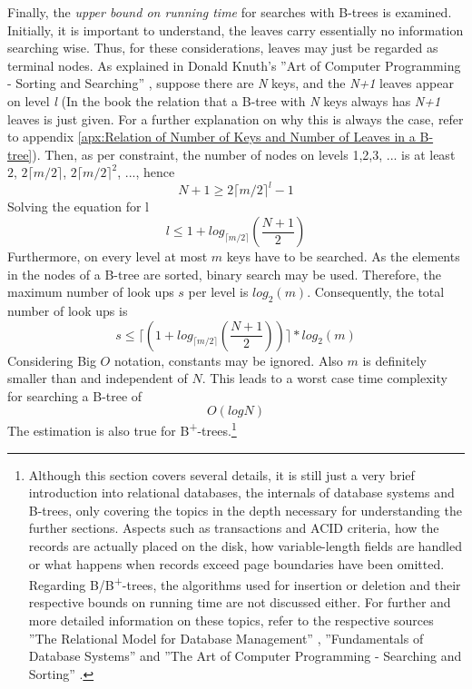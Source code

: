 Finally, the \emph{upper bound on running time} for searches with B-trees is examined. Initially, it is important to understand, the leaves carry essentially no information searching wise. Thus, for these considerations, leaves may just be regarded as terminal nodes. As explained in Donald Knuth's ''Art of Computer Programming - Sorting and Searching'' \cite{SortingSearchingBible}, suppose there are \emph{N} keys, and the \emph{N+1} leaves appear on level \emph{l} (In the book the relation that a B-tree with \emph{N} keys always has \emph{N+1} leaves is just given. For a further explanation on why this is always the case, refer to appendix \ref{apx:Relation of Number of Keys and Number of Leaves in a B-tree}). Then, as per constraint, the number of nodes on levels 1,2,3, ... is at least $2$, $2 \lceil m/2 \rceil$, $2 \lceil m/2 \rceil ^2$, ..., hence
$$ N + 1 \geq 2 \lceil m/2 \rceil ^l-1 $$
Solving the equation for l
$$ l \leq 1 + log_{\lceil m/2 \rceil}(\frac{N + 1}{2}) $$
Furthermore, on every level at most $m$ keys have to be searched. As the elements in the nodes of a B-tree are sorted, binary search may be used. Therefore, the maximum number of look ups $s$ per level is $log_2(m)$. Consequently, the total number of look ups is 
$$ s \leq \lceil (1 + log_{\lceil m/2 \rceil}(\frac{N + 1}{2})) \rceil * log_2(m) $$ 
Considering Big $O$ notation, constants may be ignored. Also $m$ is definitely smaller than and independent of $N$. This leads to a worst case time complexity for searching a B-tree of 
$$ O(log N) $$ 
The estimation is also true for B\textsuperscript{+}-trees.\footnote{Although this section covers several details, it is still just a very brief introduction into relational databases, the internals of database systems and B-trees, only covering the topics in the depth necessary for understanding the further sections. Aspects such as transactions and ACID criteria, how the records are actually placed on the disk, how variable-length fields are handled or what happens when records exceed page boundaries have been omitted. Regarding B/B\textsuperscript{+}-trees, the algorithms used for insertion or deletion and their respective bounds on running time are not discussed either. For further and more detailed information on these topics, refer to the respective sources ''The Relational Model for Database Management'' \cite{RelationalDatabaseModel}, ''Fundamentals of Database Systems'' \cite{DatabaseFundamentals} and ''The Art of Computer Programming - Searching and Sorting'' \cite{SortingSearchingBible}.}

